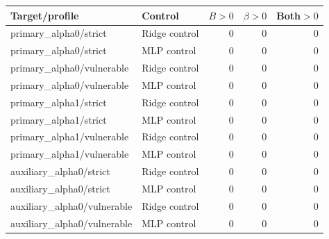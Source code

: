\begin{tabular}{llrrr}
\toprule
Target/profile & Control & $B>0$ & $\beta>0$ & Both$>0$ \\
\midrule
primary\_alpha0/strict & Ridge control & 0 & 0 & 0 \\
primary\_alpha0/strict & MLP control & 0 & 0 & 0 \\
primary\_alpha0/vulnerable & Ridge control & 0 & 0 & 0 \\
primary\_alpha0/vulnerable & MLP control & 0 & 0 & 0 \\
primary\_alpha1/strict & Ridge control & 0 & 0 & 0 \\
primary\_alpha1/strict & MLP control & 0 & 0 & 0 \\
primary\_alpha1/vulnerable & Ridge control & 0 & 0 & 0 \\
primary\_alpha1/vulnerable & MLP control & 0 & 0 & 0 \\
auxiliary\_alpha0/strict & Ridge control & 0 & 0 & 0 \\
auxiliary\_alpha0/strict & MLP control & 0 & 0 & 0 \\
auxiliary\_alpha0/vulnerable & Ridge control & 0 & 0 & 0 \\
auxiliary\_alpha0/vulnerable & MLP control & 0 & 0 & 0 \\
\bottomrule
\end{tabular}
